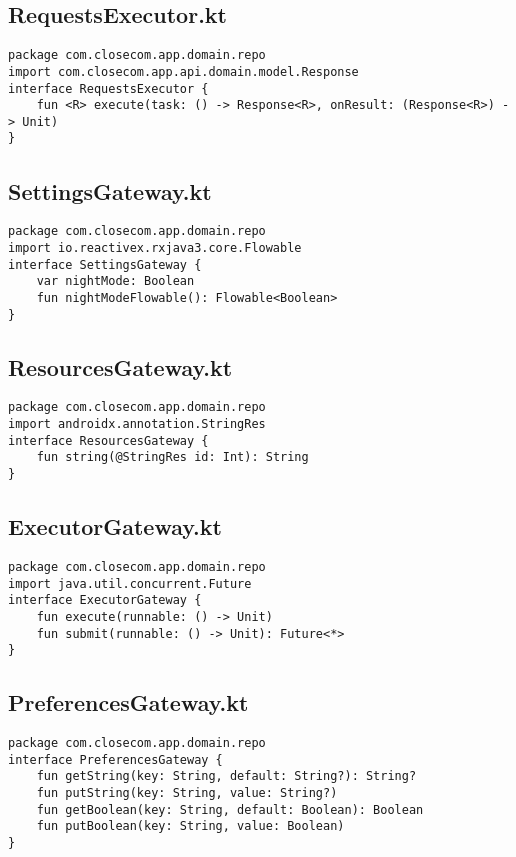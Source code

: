 \documentclass[listing]{espd}
\begin{document}
\subsection{RequestsExecutor.kt}
\begin{verbatim}
package com.closecom.app.domain.repo
import com.closecom.app.api.domain.model.Response
interface RequestsExecutor {
    fun <R> execute(task: () -> Response<R>, onResult: (Response<R>) -
> Unit)
}
\end{verbatim}

\subsection{SettingsGateway.kt}
\begin{verbatim}
package com.closecom.app.domain.repo
import io.reactivex.rxjava3.core.Flowable
interface SettingsGateway {
    var nightMode: Boolean
    fun nightModeFlowable(): Flowable<Boolean>
}
\end{verbatim}

\subsection{ResourcesGateway.kt}
\begin{verbatim}
package com.closecom.app.domain.repo
import androidx.annotation.StringRes
interface ResourcesGateway {
    fun string(@StringRes id: Int): String
}
\end{verbatim}

\subsection{ExecutorGateway.kt}
\begin{verbatim}
package com.closecom.app.domain.repo
import java.util.concurrent.Future
interface ExecutorGateway {
    fun execute(runnable: () -> Unit)
    fun submit(runnable: () -> Unit): Future<*>
}
\end{verbatim}

\subsection{PreferencesGateway.kt}
\begin{verbatim}
package com.closecom.app.domain.repo
interface PreferencesGateway {
    fun getString(key: String, default: String?): String?
    fun putString(key: String, value: String?)
    fun getBoolean(key: String, default: Boolean): Boolean
    fun putBoolean(key: String, value: Boolean)
}
\end{verbatim}
\end{document}
